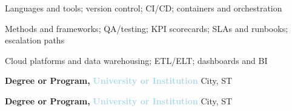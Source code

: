 \documentclass[10pt,a4paper,ragged2e,withhyper]{altacv}
\makeatletter
\let\IM@cvsubsection\cvsubsection
\renewcommand{\cvsubsection}[1]{%
  {\setlength{\smallskipamount}{0pt plus 0pt minus 0pt}%
   \IM@cvsubsection{#1}}%
}
\newcommand{\ATSVisual}[2]{\BeginAccSupp{ActualText={#1}}#2\EndAccSupp{}}
\newlength{\EduYearWidth}
\newlength{\EduLineSep}
\newcommand{\EduLine}[4]{%
  {\begingroup
    \noindent
    \makebox[\EduYearWidth][l]{\normalsize #1}%
    {\textcolor{name}{\normalsize\textbf{#2, }}\textcolor{LightBlue}{\normalsize\textbf{#3}}}%
    \hfill {\small\textnormal{\textcolor{name}{#4}}}%
    \par\vspace{\EduLineSep}%
  \endgroup}%
}
\newif\ifATS              %
\makeatother
\begin{document}

\ifATS
\begin{itemize}[leftmargin=*, itemsep=0.2em,
                label=\ATSVisual{- }{\textbullet}, labelsep=0.35em]
  \item \textbf{Data \& Automation:} Languages and tools (programming, scripting, version control); CI/CD; containers/orchestration
  \item \textbf{Methods \& Governance:} Methods and frameworks; QA/testing; KPI scorecards; SLAs/runbooks; escalation paths
  \item \textbf{Cloud \& Analytics:} Cloud platforms/data warehousing; ETL/ELT; dashboards/BI
\end{itemize}
\else
\begin{paracol}{3}

\footnotesize
Languages and tools; version control; CI/CD; containers and orchestration

\switchcolumn

\footnotesize
Methods and frameworks; QA/testing; KPI scorecards; SLAs and runbooks; escalation paths

\switchcolumn

\footnotesize
Cloud platforms and data warehousing; ETL/ELT; dashboards and BI

\end{paracol}
\fi


\EduLine{20XX}{Degree or Program}{University or Institution}{City, ST}
\EduLine{20XX}{Degree or Program}{University or Institution}{City, ST}

\divider
\end{document}
